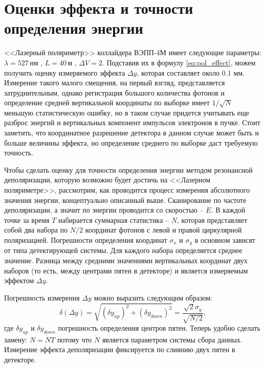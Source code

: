 \section{Оценки эффекта и точности определения энергии}
<<Лазерный поляриметр>> коллайдера ВЭПП-4М имеет следующие параметры: $\lambda = 527$\,нм , $L = 40$\,м , $\Delta V = 2$. Подставив их в формулу \ref{eq:pol_effect}, можем получить оценку измеряемого эффекта $\Delta y$, которая составляет около  0.1 мм. Измерение такого малого смещения, на первый взгляд, представляется затруднительным, однако регистрация большого количества фотонов и определение средней вертикальной координаты по выборке имеет $1/\sqrt{N}$ меньшую статистическую ошибку, но в таком случае придется учитывать еще разброс энергий  и вертикальных компонент импульсов электронов в пучке. Стоит заметить, что координатное разрешение детектора в данном случае может быть и больше величины эффекта, но определение среднего по выборке даст требуемую точность. 
\par Чтобы сделать оценку для точности определения энергии методом резонансной деполяризации, которую возможно будет достичь на <<Лазерном поляриметре>>, рассмотрим, как проводится процесс измерения абсолютного значения энергии, концептуально описанный выше. Сканирование по частоте деполяризации, а значит по энергии проводится со скоростью -- $\dot{E}$. В каждой точке за время $T$ набирается суммарная статистика -- $N$, которая представляет собой два набора по $N/2$ координат фотонов с левой и правой циркулярной поляризацией. Погрешности определения координат $\sigma_x$ и $\sigma_y$  в основном зависят от типа детектирующей системы. Для каждого набора определяется среднее значение. Разница между средними значениями вертикальных координат двух наборов (то есть, между центрами пятен в детекторе) и является измеряемым эффектом $\Delta y$. 

 Погрешность измерения $\Delta y$ можно выразить следующим образом: 
\begin{equation}
	\delta(\Delta y) = \sqrt{(\delta y_{up})^2 + (\delta y_{down})^2} = \frac{\sqrt{2} \sigma_y}{\sqrt{N/2}},
\end{equation}
где $\delta y_{up}$ и $\delta y_{down}$ погрешность определения центров пятен.
Теперь удобно сделать замену: $N = \dot{N}T$ потому что $\dot{N}$ является параметром системы сбора данных. Измерение эффекта деполяризации фиксируется по слиянию двух пятен в детекторе. 

